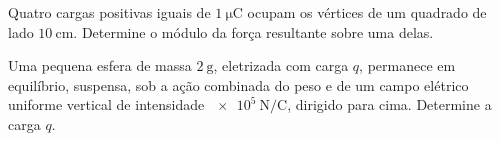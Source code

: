 \begin{questao}[2]{}

Quatro cargas positivas iguais de $\SI{1}{\micro\coulomb}$ ocupam os vértices de
um quadrado de lado $\SI{10}{\centi\meter}$. Determine o módulo da força
resultante sobre uma delas.




\end{questao}
\begin{questao}[2]{}

Uma pequena esfera de massa $\SI{2}{\gram}$, eletrizada com carga $q$, permanece
em equilíbrio, suspensa, sob a ação combinada do peso e de um campo elétrico
uniforme vertical de intensidade $\SI{e5}{\newton\per\coulomb}$, dirigido para
cima. Determine a carga $q$.


\end{questao}

